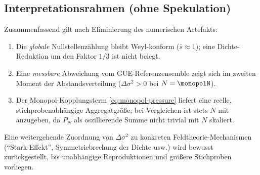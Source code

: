 \subsection{Interpretationsrahmen (ohne Spekulation)}

Zusammenfassend gilt nach Eliminierung des numerischen Artefakts:

\begin{enumerate}
  \item Die \emph{globale} Nullstellenzählung bleibt Weyl-konform
        ($\bar{s}\approx 1$); eine Dichte-Reduktion um den Faktor $1/3$ ist
        nicht belegt.
  \item Eine \emph{messbare} Abweichung vom GUE-Referenzensemble zeigt sich im
        zweiten Moment der Abstandsverteilung ($\Delta\sigma^2 > 0$ bei
        $N=\monopolN$).
  \item Der Monopol-Kopplungsterm \eqref{eq:monopol-pressure} liefert eine
        reelle, stichprobenabhängige Aggregatgröße; bei Vergleichen ist stets
        $N$ mit anzugeben, da $P_N$ als oszillierende Summe nicht
        trivial mit $N$ skaliert.
\end{enumerate}

Eine weitergehende Zuordnung von $\Delta\sigma^2$ zu konkreten Feldtheorie-Mechanismen
(``Stark-Effekt'', Symmetriebrechung der Dichte usw.) wird bewusst zurückgestellt,
bis unabhängige Reproduktionen und größere Stichproben vorliegen.
